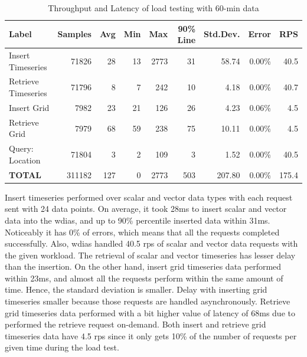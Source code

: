 \begin{table}[ht]
\caption{Throughput and Latency of load testing with 60-min data}
\footnotesize
\begin{tabulary}{\linewidth}{|L|R|R|R|R|R|R|R|R|}
\hline
\textbf{Label} & \textbf{Samples} & \textbf{Avg} & \textbf{Min} & \textbf{Max} & \textbf{90\% Line} & \textbf{Std.Dev.} & \textbf{Error} & \textbf{RPS} \\ \hline
Insert Timeseries & 71826 & 28 & 13 & 2773 & 31 & 58.74 & 0.00\% & 40.5 \\ \hline
Retrieve Timeseries & 71796 & 8 & 7 & 242 & 10 & 4.18 & 0.00\% & 40.7 \\ \hline
Insert Grid & 7982 & 23 & 21 & 126 & 26 & 4.23 & 0.06\% & 4.5 \\ \hline
Retrieve Grid & 7979 & 68 & 59 & 238 & 75 & 10.11 & 0.00\% & 4.5 \\ \hline
Query: Location & 71804 & 3 & 2 & 109 & 3 & 1.52 & 0.00\% & 40.5 \\ \hline
\textbf{TOTAL} & 311182 & 127 & 0 & 2773 & 503 & 207.80 & 0.00\% & 175.4 \\ \hline
\end{tabulary}
\label{tab:obs_all_60_min_summary}
\end{table}
Insert timeseries performed over scalar and vector data types with each request sent with 24 data points. On average, it took 28ms to insert scalar and vector data into the \acrshort{wdias}, and up to 90\% percentile inserted data within 31ms. Noticeably it has 0\% of errors, which means that all the requests completed successfully. Also, \acrshort{wdias} handled 40.5 \acrshort{rps} of scalar and vector data requests with the given workload. The retrieval of scalar and vector timeseries has lesser delay than the insertion.
On the other hand, insert grid timeseries data performed within 23ms, and almost all the requests perform within the same amount of time. Hence, the standard deviation is smaller. Delay with inserting grid timeseries smaller because those requests are handled asynchronously. Retrieve grid timeseries data performed with a bit higher value of latency of 68ms due to performed the retrieve request on-demand. Both insert and retrieve grid timeseries data have 4.5 \acrshort{rps} since it only gets 10\% of the number of requests per given time during the load test.

